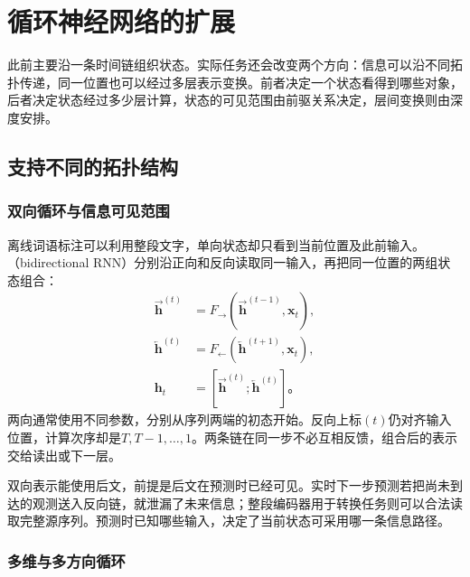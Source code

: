 \section{循环神经网络的扩展}
\label{sec:rnn-extensions}

此前主要沿一条时间链组织状态。实际任务还会改变两个方向：信息可以沿不同拓扑传递，同一位置也可以经过多层表示变换。前者决定一个状态看得到哪些对象，后者决定状态经过多少层计算，状态的可见范围由前驱关系决定，层间变换则由深度安排。

\subsection{支持不同的拓扑结构}
\label{sec:rnn-topologies}

\subsubsection{双向循环与信息可见范围}
\label{sec:rnn-bidirectional}

离线词语标注可以利用整段文字，单向状态却只看到当前位置及此前输入。（bidirectional RNN）分别沿正向和反向读取同一输入，再把同一位置的两组状态组合：
\begin{equation}
  \begin{aligned}
    \overrightarrow{\bm{h}}^{(t)}&=F_{\rightarrow}\!\left(
       \overrightarrow{\bm{h}}^{(t-1)},\bm{x}_t\right),\\
    \overleftarrow{\bm{h}}^{(t)}&=F_{\leftarrow}\!\left(
       \overleftarrow{\bm{h}}^{(t+1)},\bm{x}_t\right),\\
    \bm{h}_t&=[\overrightarrow{\bm{h}}^{(t)};
                 \overleftarrow{\bm{h}}^{(t)}]\text{。}
  \end{aligned}
  \label{eq:rnn-bidirectional}
\end{equation}
两向通常使用不同参数，分别从序列两端的初态开始。反向上标$(t)$仍对齐输入位置，计算次序却是$T,T-1,\ldots,1$。两条链在同一步不必互相反馈，组合后的表示交给读出或下一层。

双向表示能使用后文，前提是后文在预测时已经可见。实时下一步预测若把尚未到达的观测送入反向链，就泄漏了未来信息；整段编码器用于转换任务则可以合法读取完整源序列。预测时已知哪些输入，决定了当前状态可采用哪一条信息路径。

\subsubsection{多维与多方向循环}
\label{sec:rnn-multidimensional}

